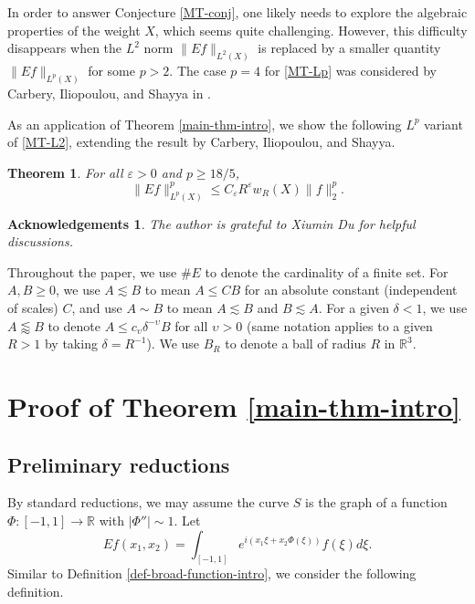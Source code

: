 \documentclass{amsart}
\numberwithin{equation}{section}
\newtheorem*{acknowledgement}{Acknowledgements}
\newtheorem{theorem}{Theorem}[section]
\newcommand{\de}{\delta}
\newcommand{\e}{\varepsilon}
\newcommand{\ZR}{\mathbb{R}}
\begin{document}
In order to answer Conjecture \ref{MT-conj}, one likely needs to explore the algebraic properties of the weight $X$, which seems quite challenging.
However, this difficulty disappears when the $L^2$ norm $\|Ef\|_{L^2(X)}$ is replaced by a smaller quantity $\|Ef\|_{L^p(X)}$ for some $p>2$.
The case $p=4$ for \eqref{MT-Lp} was considered by Carbery, Iliopoulou, and Shayya in \cite{Oberwolfach-report}.


As an application of Theorem \ref{main-thm-intro}, we show the following $L^p$ variant of \eqref{MT-L2}, extending the result by Carbery, Iliopoulou, and Shayya.


\begin{theorem}
\label{MT-thm}
For all $\e>0$ and $p\geq 18/5$,
\begin{equation}
\label{MT-Lp}
    \|Ef\|_{L^p(X)}^p\leq C_\e R^\e w_R(X)\|f\|_2^p.
\end{equation}
\end{theorem}

\medskip 

\begin{acknowledgement}
\rm
The author is grateful to Xiumin Du for helpful discussions.
\end{acknowledgement}
    
\medskip

Throughout the paper, we use $\# E$ to denote the cardinality of a finite set.
For $A,B\geq 0$, we use $A\lesssim B$ to mean $A\leq CB$ for an absolute constant (independent of scales) $C$, and use $A\sim B$ to mean $A\lesssim B$ and $B\lesssim A$.
For a given $\de<1$, we use $ A \lessapprox B$ to denote $A\leq c_{\upsilon}\de^{-\upsilon} B$ for all $\upsilon>0$ (same notation applies to a given $R>1$ by taking $\de=R^{-1}$). 
We use $B_R$ to denote a ball of radius $R$ in $\ZR^3$.


\bigskip




\section{Proof of Theorem \ref{main-thm-intro}}

\subsection{Preliminary reductions}
By standard reductions, we may assume the curve $S$ is the graph of a function $\Phi:[-1,1]\to\ZR$ with $|\Phi''|\sim1$.
Let
\begin{equation}
\label{extension-reduced}
    Ef(x_1,x_2)=\int_{[-1,1]}e^{i(x_1\xi+x_2\Phi(\xi))}f(\xi)d\xi.
\end{equation}
Similar to Definition \ref{def-broad-function-intro}, we consider the following definition.
\end{document}
